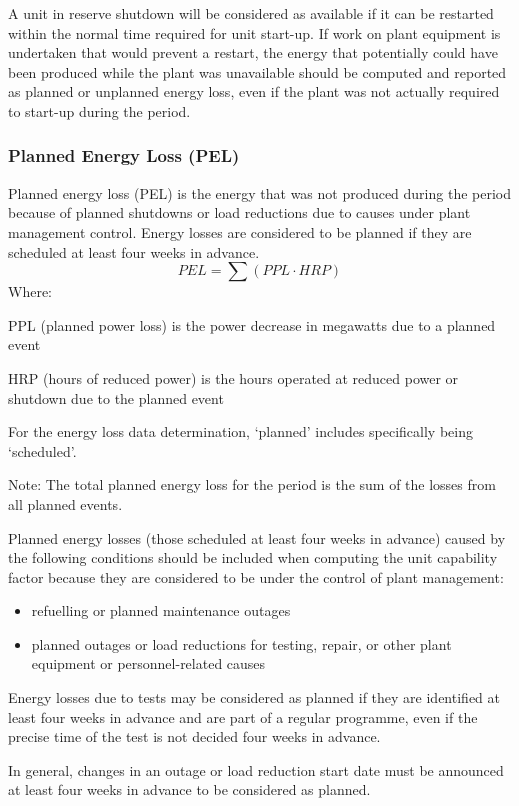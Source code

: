 A unit in reserve shutdown will be considered as available if it can
be restarted within the normal time required for unit start-up. If
work on plant equipment is undertaken that would prevent a restart,
the energy that potentially could have been produced while the plant
was unavailable should be computed and reported as planned or
unplanned energy loss, even if the plant was not actually required to
start-up during the period.

\subsubsection{Planned Energy Loss (PEL)}
Planned energy loss (PEL) is the energy that was not produced during the period because of planned shutdowns or load reductions due to causes under plant management control. Energy losses are considered to be planned if they are scheduled at least four weeks in advance.
$$PEL = \sum{(PPL \cdot HRP)}$$
Where:

PPL (planned power loss) is the power decrease in megawatts due to a
planned event

HRP (hours of reduced power) is the hours operated at reduced power or
shutdown due to the planned event

For the energy loss data determination, ‘planned’ includes
specifically being ‘scheduled’.

Note:	The total planned energy loss for the period is the sum of the
losses from all planned events.

Planned energy losses (those scheduled at least four weeks in advance)
caused by the following conditions should be included when computing
the unit capability factor because they are considered to be under the
control of plant management:
\begin{itemize}
\item refuelling or planned maintenance outages
\item planned outages or load reductions for testing, repair, or other
  plant equipment or personnel-related causes
\end{itemize}

Energy losses due to tests may be considered as planned if they are
identified at least four weeks in advance and are part of a regular
programme, even if the precise time of the test is not decided four
weeks in advance.

In general, changes in an outage or load reduction start date must be
announced at least four weeks in advance to be considered as planned.

